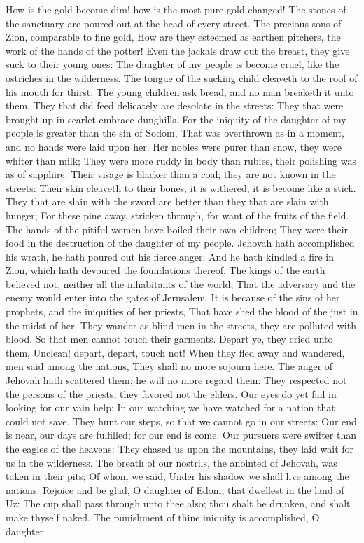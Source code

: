 How is the gold become dim! how is the most pure gold changed! The stones of the sanctuary are poured out at the head of every street.  The precious sons of Zion, comparable to fine gold, How are they esteemed as earthen pitchers, the work of the hands of the potter!  Even the jackals draw out the breast, they give suck to their young ones: The daughter of my people is become cruel, like the ostriches in the wilderness.  The tongue of the sucking child cleaveth to the roof of his mouth for thirst: The young children ask bread, and no man breaketh it unto them.  They that did feed delicately are desolate in the streets: They that were brought up in scarlet embrace dunghills.  For the iniquity of the daughter of my people is greater than the sin of Sodom, That was overthrown as in a moment, and no hands were laid upon her.  Her nobles were purer than snow, they were whiter than milk; They were more ruddy in body than rubies, their polishing was as of sapphire.  Their visage is blacker than a coal; they are not known in the streets: Their skin cleaveth to their bones; it is withered, it is become like a stick.  They that are slain with the sword are better than they that are slain with hunger; For these pine away, stricken through, for want of the fruits of the field.  The hands of the pitiful women have boiled their own children; They were their food in the destruction of the daughter of my people.  Jehovah hath accomplished his wrath, he hath poured out his fierce anger; And he hath kindled a fire in Zion, which hath devoured the foundations thereof.  The kings of the earth believed not, neither all the inhabitants of the world, That the adversary and the enemy would enter into the gates of Jerusalem.  It is because of the sins of her prophets, and the iniquities of her priests, That have shed the blood of the just in the midst of her.  They wander as blind men in the streets, they are polluted with blood, So that men cannot touch their garments.  Depart ye, they cried unto them, Unclean! depart, depart, touch not! When they fled away and wandered, men said among the nations, They shall no more sojourn here.  The anger of Jehovah hath scattered them; he will no more regard them: They respected not the persons of the priests, they favored not the elders.  Our eyes do yet fail in looking for our vain help: In our watching we have watched for a nation that could not save.  They hunt our steps, so that we cannot go in our streets: Our end is near, our days are fulfilled; for our end is come.  Our pursuers were swifter than the eagles of the heavens: They chased us upon the mountains, they laid wait for us in the wilderness.  The breath of our nostrils, the anointed of Jehovah, was taken in their pits; Of whom we said, Under his shadow we shall live among the nations.  Rejoice and be glad, O daughter of Edom, that dwellest in the land of Uz: The cup shall pass through unto thee also; thou shalt be drunken, and shalt make thyself naked.  The punishment of thine iniquity is accomplished, O daughter 